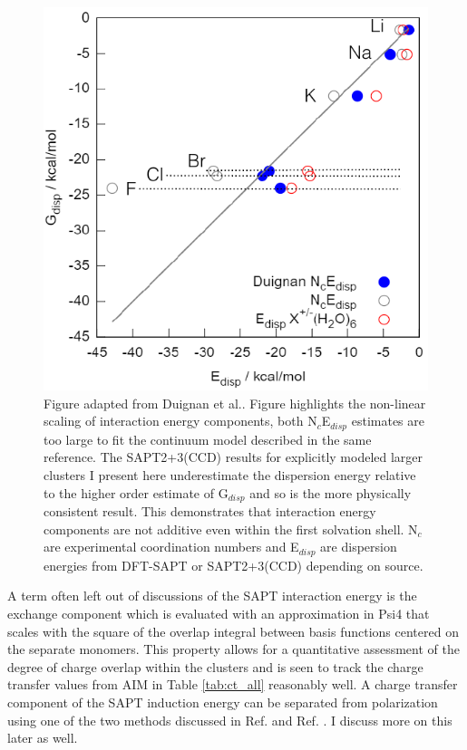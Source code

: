\begin{sie}
\begin{figure}
 \begin{center}
  \includegraphics[width=0.8\linewidth]{images/ct_main/duignan_disp.png}
 \end{center}
 \caption[Ion/water dispersion energies and non-linear scaling]{\label{fig:duignan_disp}Figure adapted from Duignan et al.\cite{duignan2014collins}. 
 Figure highlights the non-linear scaling of interaction energy components, both N$_{c}$E$_{disp}$ estimates are too large to fit the continuum
 model described in the same reference. The SAPT2+3(CCD) results for explicitly modeled larger clusters I present here underestimate the dispersion 
 energy relative to the higher order estimate of G$_{disp}$ and so is the more physically consistent result. This demonstrates that interaction 
 energy components are not additive even within the first solvation shell. N$_{c}$ are experimental coordination numbers and E$_{disp}$ are dispersion
 energies from DFT-SAPT or SAPT2+3(CCD) depending on source.}
\end{figure}

  A term often left out of discussions of the SAPT interaction energy is the exchange component which is evaluated with an approximation
  in Psi4 that scales with the square of the overlap integral between basis functions centered on the separate monomers. This property allows for a quantitative 
  assessment of the degree of charge overlap within the clusters and is seen to track the charge transfer values from AIM in Table \ref{tab:ct_all} reasonably 
  well. A charge transfer component of the SAPT induction energy can be separated from polarization using one of the two methods discussed in Ref. \cite{stone2009ct} 
  and Ref. \cite{jeziorski2004regsapt,misquitta2013regsapt}. I discuss more on this later as well.


\end{sie}
